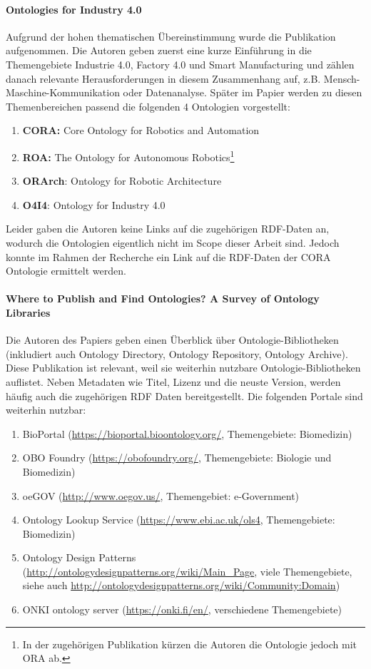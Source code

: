 \documentclass{article}
\begin{document}
\paragraph{Ontologies for Industry 4.0} Aufgrund der hohen thematischen Übereinstimmung wurde die Publikation \cite{kumar2019ontologies} aufgenommen.
Die Autoren geben zuerst eine kurze Einführung in die Themengebiete Industrie 4.0, Factory 4.0 und Smart Manufacturing und zählen danach relevante Herausforderungen in diesem Zusammenhang auf, z.B. Mensch-Maschine-Kommunikation oder Datenanalyse.
Später im Papier werden zu diesen Themenbereichen passend die folgenden 4 Ontologien vorgestellt:
\begin{enumerate}
    \item \textbf{CORA:} Core Ontology for Robotics and Automation
    \item \textbf{ROA:} The Ontology for Autonomous Robotics\footnote{In der zugehörigen Publikation\cite{olszewska2017ontology} kürzen die Autoren die Ontologie jedoch mit ORA ab.}
    \item \textbf{ORArch}: Ontology for Robotic Architecture
    \item \textbf{O4I4}: Ontology for Industry 4.0
\end{enumerate}

Leider gaben die Autoren keine Links auf die zugehörigen RDF-Daten an, wodurch die Ontologien eigentlich nicht im Scope dieser Arbeit sind.
Jedoch konnte im Rahmen der Recherche ein Link auf die RDF-Daten der CORA Ontologie ermittelt werden.

\paragraph{Where to Publish and Find Ontologies? A Survey of Ontology Libraries} Die Autoren des Papiers \cite{d2012publish} geben einen Überblick über Ontologie-Bibliotheken (inkludiert auch Ontology Directory, Ontology Repository, Ontology Archive).
Diese Publikation ist relevant, weil sie weiterhin nutzbare Ontologie-Bibliotheken auflistet.
Neben Metadaten wie Titel, Lizenz und die neuste Version, werden häufig auch die zugehörigen RDF Daten bereitgestellt.
Die folgenden Portale sind weiterhin nutzbar:

\begin{enumerate}
    \item BioPortal (\url{https://bioportal.bioontology.org/}, Themengebiete: Biomedizin)
    \item OBO Foundry (\url{https://obofoundry.org/}, Themengebiete: Biologie und Biomedizin)
    \item oeGOV (\url{http://www.oegov.us/}, Themengebiet: e-Government)
    \item Ontology Lookup Service (\url{https://www.ebi.ac.uk/ols4}, Themengebiete: Biomedizin)
    \item Ontology Design Patterns (\url{http://ontologydesignpatterns.org/wiki/Main\_Page}, viele Themengebiete, siehe auch \url{http://ontologydesignpatterns.org/wiki/Community:Domain})
    \item ONKI ontology server (\url{https://onki.fi/en/}, verschiedene Themengebiete)
\end{enumerate}
\end{document}
